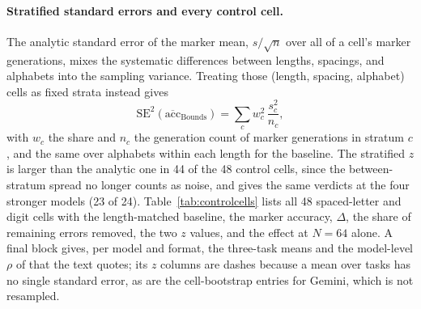\documentclass[10pt]{article} %
\begin{document}
\paragraph{Stratified standard errors and every control cell.} The analytic standard error of the marker mean, $s/\sqrt{n}$ over all of a cell's marker generations, mixes the systematic differences between lengths, spacings, and alphabets into the sampling variance. Treating those (length, spacing, alphabet) cells as fixed strata instead gives
\begin{equation}
\mathrm{SE}^2\!\left(\overline{\mathrm{acc}}_{\text{Bounds}}\right) = \sum_c w_c^2\, \frac{s_c^2}{n_c},
\label{eq:sestrat}
\end{equation}
with $w_c$ the share and $n_c$ the generation count of marker generations in stratum $c$, and the same over alphabets within each length for the baseline. The stratified $z$ is larger than the analytic one in 44 of the 48 control cells, since the between-stratum spread no longer counts as noise, and gives the same verdicts at the four stronger models (23 of 24). Table~\ref{tab:controlcells} lists all 48 spaced-letter and digit cells with the length-matched baseline, the marker accuracy, $\Delta$, the share of remaining errors removed, the two $z$ values, and the effect at $N = 64$ alone. A final block gives, per model and format, the three-task means and the model-level $\rho$ of  that the text quotes; its $z$ columns are dashes because a mean over tasks has no single standard error, as are the cell-bootstrap entries for Gemini, which is not resampled.

\begin{table}[!htbp]
\centering
\scriptsize
\renewcommand{\arraystretch}{0.86}\setlength{\tabcolsep}{3.5pt}
\caption{Every pooled cell of the two tokenization controls ($N \le 64$, $k \in \{1, 2, 4, 8, 16\}$, all alphabet sizes). No markers: the no-marker accuracy length-matched to the marker runs; share removed: $\Delta / (1 - \text{no-marker})$, left blank where the no-marker accuracy is above 0.98 and the denominator too small to divide by; $z$ (stratified): the fixed-strata estimator of , the paper's default; $z$ (cell bootstrap): resampling whole (length, spacing, alphabet) cells (open models only); $\Delta$ at $N = 64$: the same effect at the longest length alone, which the text quotes separately. Significance is $|z| \ge 3.54$. $\Delta$, the share removed, the $z$ values, and the 0.02 cutoff on the denominator are all computed from unrounded cell means, so a row whose rounded no-marker accuracy reads 0.98 can still fall under the cutoff and print a blank. Bold: $|z| \ge 3.54$ in either $z$ column.}
\label{tab:controlcells}

\end{table}
\end{document}
